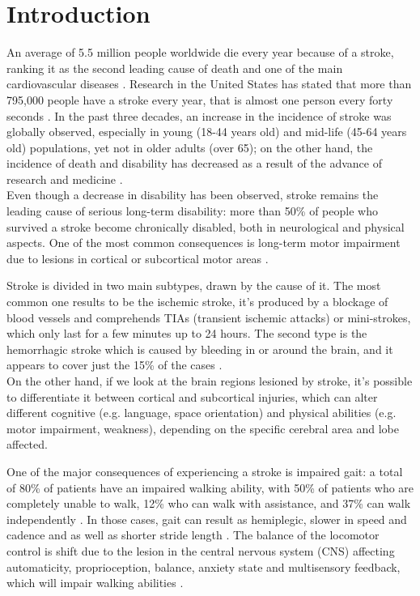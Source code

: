 \chapter{Introduction}
An average of 5.5 million people worldwide die every year because of a stroke, ranking it as the second leading cause of death and one of the main cardiovascular diseases \parencite{Donkor_2018}. Research in the United States has stated that more than 795,000 people have a stroke every year, that is almost one person every forty seconds \parencite{Tsao_2023}. In the past three decades, an increase in the incidence of stroke was globally observed, especially in young (18-44 years old) and mid-life (45-64 years old) populations, yet not in older adults (over 65); on the other hand, the incidence of death and disability has decreased as a result of the advance of research and medicine \parencite{Yahya_2020}. \\
Even though a decrease in disability has been observed, stroke remains the leading cause of serious long-term disability: more than 50\% of people who survived a stroke become chronically disabled, both in neurological and physical aspects. One of the most common consequences is long-term motor impairment due to lesions in cortical or subcortical motor areas \parencite{Karthikeyan_2019}. 

Stroke is divided in two main subtypes, drawn by the cause of it. The most common one results to be the ischemic stroke, it's produced by a blockage of blood vessels and comprehends TIAs (transient ischemic attacks) or mini-strokes, which only last for a few minutes up to 24 hours. The second type is the hemorrhagic stroke which is caused by bleeding in or around the brain, and it appears to cover just the 15\% of the cases \parencite{Abdu_2021}. \\
On the other hand, if we look at the brain regions lesioned by stroke, it's possible to differentiate it between cortical and subcortical injuries, which can alter different cognitive (e.g. language, space orientation) and physical abilities (e.g. motor impairment, weakness), depending on the specific cerebral area and lobe affected. 

One of the major consequences of experiencing a stroke is impaired gait: a total of 80\% of patients have an impaired walking ability, with 50\% of patients who are completely unable to walk, 12\% who can walk with assistance, and 37\% can walk independently \parencite{Balaban_2014}. In those cases, gait can result as hemiplegic, slower in speed and cadence and as well as shorter stride length \parencite{Gomez_2020}. The balance of the locomotor control is shift due to the lesion in the central nervous system (CNS) affecting automaticity, proprioception, balance, anxiety state and multisensory feedback, which will impair walking abilities \parencite{Clark_2015}. 

